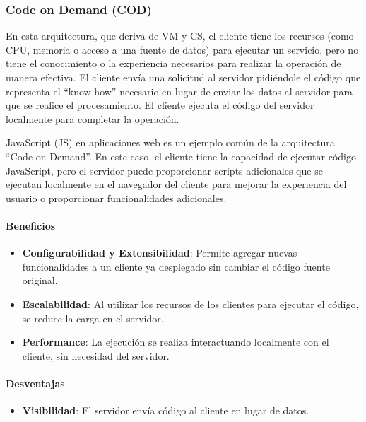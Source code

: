 \documentclass{article}
\begin{document}
		\subsubsection{Code on Demand (COD)}\label{sec:code_on_demand}
		En esta arquitectura, que deriva de VM y CS, el cliente tiene los recursos (como CPU, memoria o acceso a una fuente de datos) para ejecutar un servicio, pero no tiene el conocimiento o la experiencia necesarios para realizar la operación de manera efectiva. El cliente envía una solicitud al servidor pidiéndole el código que representa el ``know-how'' necesario en lugar de enviar los datos al servidor para que se realice el procesamiento. El cliente ejecuta el código del servidor localmente para completar la operación.
		
		JavaScript (JS) en aplicaciones web es un ejemplo común de la arquitectura ``Code on Demand''. En este caso, el cliente tiene la capacidad de ejecutar código JavaScript, pero el servidor puede proporcionar scripts adicionales que se ejecutan localmente en el navegador del cliente para mejorar la experiencia del usuario o proporcionar funcionalidades adicionales.
		
		\paragraph{Beneficios}
			\begin{itemize}	
				\item {\textbf{Configurabilidad y Extensibilidad}}: Permite agregar nuevas funcionalidades a un cliente ya desplegado sin cambiar el código fuente original.
								
				\item {\textbf{Escalabilidad}}: Al utilizar los recursos de los clientes para ejecutar el código, se reduce la carga en el servidor.
				
				\item {\textbf{Performance}}: La ejecución se realiza interactuando localmente con el
				cliente, sin necesidad del servidor.
				
			\end{itemize}
		
		\paragraph{Desventajas}
			\begin{itemize}	
				\item {\textbf{Visibilidad}}: El servidor envía código al cliente en lugar de datos.			
			\end{itemize}
		
\end{document}
